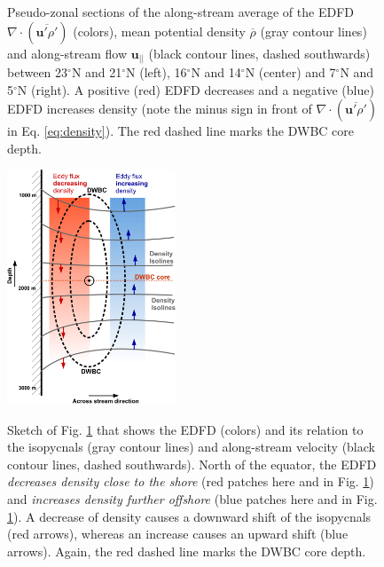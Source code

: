 \documentclass{ametsoc}
\begin{document}
\begin{figure}[h!]
\begin{minipage}[]{0.32\textwidth}
	\end{minipage}
		\caption{Pseudo-zonal sections of the along-stream average of the EDFD $\nabla \cdot (\overline{\mathbf{u'}\rho'})$ (colors), mean potential density $\overline{\rho}$ (gray contour lines) and along-stream flow $\mathbf{u_{||}}$ (black contour lines, dashed southwards) between 23$^\circ$N and 21$^\circ$N (left), 16$^\circ$N and 14$^\circ$N (center) and 7$^\circ$N and 5$^\circ$N (right). A positive (red) EDFD decreases and a negative (blue) EDFD increases density (note the minus sign in front of $\nabla \cdot (\overline{\mathbf{u'}\rho'})$ in Eq. \eqref{eq:density}). The red dashed line marks the DWBC core depth.}
\label{fig:results:EDFD_north}
\end{figure}

\begin{figure}
\includegraphics[height=7cm]{figs/sketch_north.pdf}\\
\caption{Sketch of Fig. \ref{fig:results:EDFD_north} that shows the EDFD (colors) and its relation to the isopycnals (gray contour lines) and along-stream velocity (black contour lines, dashed southwards). North of the equator, the EDFD \textit{decreases density close to the shore} (red patches here and in Fig. \ref{fig:results:EDFD_north})  and \textit{increases density further offshore} (blue patches here and in Fig. \ref{fig:results:EDFD_north}). A decrease of density causes a downward shift of the isopycnals (red arrows), whereas an increase causes an upward shift (blue arrows). Again, the red dashed line marks the DWBC core depth.} 
\label{fig:sketch_dwbc_north}
\end{figure}
\end{document}
